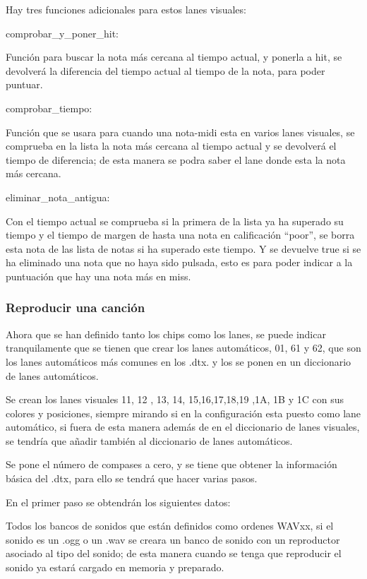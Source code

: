 \documentclass[a4paper,11pt,oneside]{book}
\begin{document}
Hay tres funciones adicionales para estos lanes visuales:

comprobar\_y\_poner\_hit:

Función para buscar la nota más cercana al tiempo actual, y ponerla a hit, se devolverá la diferencia del tiempo actual al tiempo de la nota, para poder puntuar.

comprobar\_tiempo:

Función que se usara para cuando una nota-midi esta en varios lanes visuales, se comprueba en la lista la nota más cercana al tiempo actual y se devolverá el tiempo de diferencia; de esta manera se podra saber el lane donde esta la nota más cercana.


eliminar\_nota\_antigua:

Con el tiempo actual se comprueba si la primera de la lista ya ha superado su tiempo y el tiempo de margen de hasta una nota en calificación ``poor'', se borra esta nota de las lista de notas si ha superado este tiempo. Y se devuelve true si se ha eliminado una nota que no haya sido pulsada, esto es para poder indicar a la puntuación que hay una nota más en miss.

\subsubsection{Reproducir una canción}
Ahora que se han definido tanto los chips como los lanes, se puede indicar tranquilamente que se tienen que crear los lanes automáticos, 01, 61 y 62, que son los lanes automáticos más comunes en los .dtx. y los se ponen en un diccionario de lanes automáticos.

Se crean los lanes visuales 11, 12 , 13, 14, 15,16,17,18,19 ,1A, 1B y 1C con sus colores y posiciones, siempre mirando si en la configuración esta puesto como lane automático, si fuera de esta manera además de en el diccionario de lanes visuales, se tendría que añadir también al diccionario de lanes automáticos.


Se pone el número de compases a cero, y se tiene que obtener la información básica del .dtx, para ello se tendrá que hacer varias pasos.


En el primer paso se obtendrán los siguientes datos:

Todos los bancos de sonidos que están definidos como ordenes WAVxx, si el sonido es un .ogg o un .wav se creara un banco de sonido con un reproductor asociado al tipo del sonido; de esta manera cuando se tenga que reproducir el sonido ya estará cargado en memoria y preparado.
\end{document}
